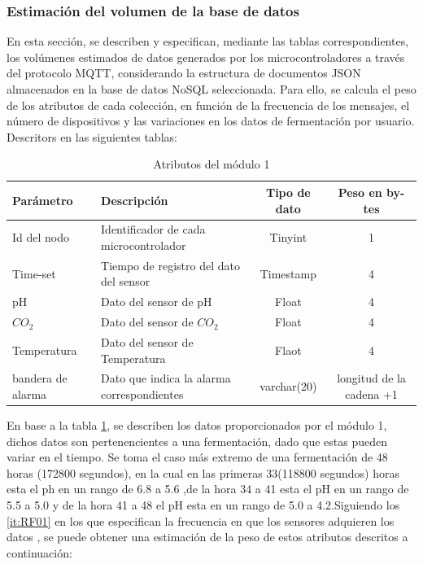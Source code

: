 \subsubsection{Estimación del volumen de la base de datos}
En esta sección, se describen y especifican, mediante las tablas correspondientes, los volúmenes estimados de 
datos generados \cite{2003} por los microcontroladores a través del protocolo MQTT, considerando la estructura de 
documentos JSON almacenados en la base de datos NoSQL seleccionada. Para ello, se calcula el peso de los 
atributos de cada colección, en función de la frecuencia de los mensajes, el número de dispositivos y las 
variaciones en los datos de fermentación por usuario. Descritors en las siguientes tablas:

\begin{table}[htbp]
	\centering
	\caption{Atributos del módulo 1}
    \label{tab:Dato1}
    \footnotesize %

    \begin{tabular}{|>{\raggedright\arraybackslash}p{2.5cm}|>{\raggedright\arraybackslash}p{6.0cm}|c|c|}
		\hline
		Parámetro & Descripción & Tipo de dato & Peso en by-tes \\ \hline
		Id del nodo & Identificador de cada microcontrolador & Tinyint & 1 \\ \hline
		Time-set & Tiempo de registro del dato del sensor & Timestamp & 4 \\ \hline
        pH & Dato del sensor de pH & Float & 4 \\ \hline
        $CO_{2}$ & Dato del sensor de $CO_{2}$ & Float & 4 \\ \hline
        Temperatura & Dato del sensor de Temperatura & Flaot & 4 \\ \hline
        bandera de alarma & Dato que indica la alarma correspondientes & varchar(20) & longitud de la cadena +1 \\ \hline
	\end{tabular}
\end{table}

En base a la tabla \cref{tab:Dato1}, se describen los datos proporcionados por el módulo 1, dichos datos son pertenencientes 
a una fermentación, dado que estas pueden variar en el tiempo. Se toma el caso más extremo 
de una fermentación de 48 horas (172800 segundos), en la cual en las primeras 
33(118800 segundos) horas esta el ph en un rango de 6.8 a 5.6
,de la hora 34 a 41 esta el pH en un rango de 5.5 a 5.0
y de la hora 41 a 48 el pH esta en un rango de
5.0 a 4.2.Siguiendo los \ref{it:RF01} en los que especifican la frecuencia en que los sensores adquieren los datos , 
se puede obtener una estimación de la peso de estos atributos descritos a continuación:

